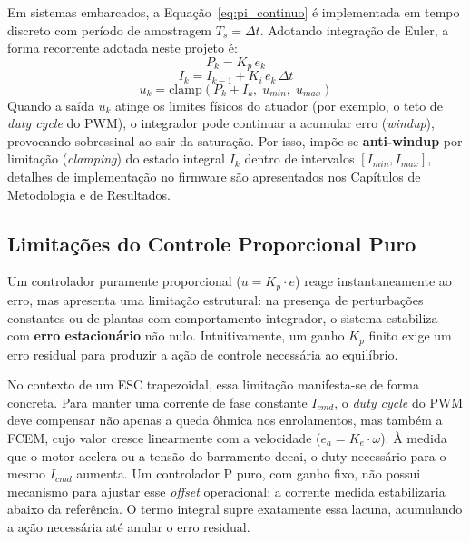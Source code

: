 Em sistemas embarcados, a Equação~\ref{eq:pi_continuo} é implementada em tempo discreto com período de amostragem $T_s = \Delta t$. Adotando integração de Euler, a forma recorrente adotada neste projeto é:
\begin{equation}
    P_k = K_p \, e_k
    \label{eq:pi_p_discreto}
\end{equation}
\begin{equation}
    I_k = I_{k-1} + K_i \, e_k \, \Delta t
    \label{eq:pi_i_discreto}
\end{equation}
\begin{equation}
    u_k = \mathrm{clamp}(P_k + I_k,\; u_{min},\; u_{max})
    \label{eq:pi_saida}
\end{equation}
Quando a saída $u_k$ atinge os limites físicos do atuador (por exemplo, o teto de \textit{duty cycle} do PWM), o integrador pode continuar a acumular erro (\textit{windup}), provocando sobressinal ao sair da saturação. Por isso, impõe-se \textbf{anti-windup} por limitação (\textit{clamping}) do estado integral $I_k$ dentro de intervalos $[I_{min}, I_{max}]$, detalhes de implementação no firmware são apresentados nos Capítulos de Metodologia e de Resultados.

\subsection{Limitações do Controle Proporcional Puro}

Um controlador puramente proporcional ($u = K_p \cdot e$) reage instantaneamente ao erro, mas apresenta uma limitação estrutural: na presença de perturbações constantes ou de plantas com comportamento integrador, o sistema estabiliza com \textbf{erro estacionário} não nulo. Intuitivamente, um ganho $K_p$ finito exige um erro residual para produzir a ação de controle necessária ao equilíbrio.

No contexto de um ESC trapezoidal, essa limitação manifesta-se de forma concreta. Para manter uma corrente de fase constante $I_{cmd}$, o \textit{duty cycle} do PWM deve compensar não apenas a queda ôhmica nos enrolamentos, mas também a FCEM, cujo valor cresce linearmente com a velocidade ($e_a = K_e \cdot \omega$). À medida que o motor acelera ou a tensão do barramento decai, o duty necessário para o mesmo $I_{cmd}$ aumenta. Um controlador P puro, com ganho fixo, não possui mecanismo para ajustar esse \textit{offset} operacional: a corrente medida estabilizaria abaixo da referência. O termo integral supre exatamente essa lacuna, acumulando a ação necessária até anular o erro residual.

